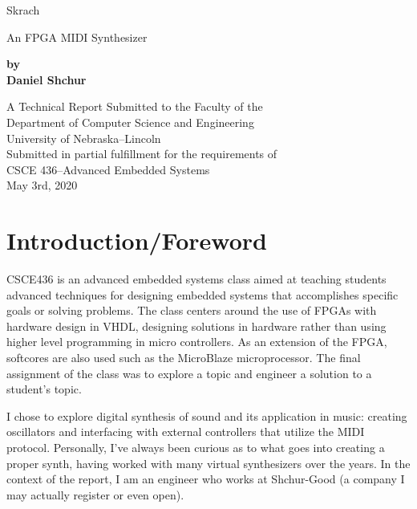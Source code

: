 \documentclass[12pt]{article}
\begin{document}
\begin{titlepage}
    \begin{center}
        \vspace*{1cm}
 
        {\fontsize{60}{75}\atnight Skrach}
 
        \vspace{0.5cm}
        \Large
        An FPGA MIDI Synthesizer
 
        \vspace{3cm}
 
        \textbf{by\\Daniel Shchur}
 
        \vfill
        
        \Large
        A Technical Report Submitted to the Faculty of the\\
        Department of Computer Science and Engineering\\
        University of Nebraska--Lincoln\\
        
        \vspace{1cm}
        Submitted in partial fulfillment for the requirements of\\
        CSCE 436--Advanced Embedded Systems\\
        May 3rd, 2020
 
    \end{center}
\end{titlepage}

\tableofcontents

\newpage

\section{Introduction/Foreword}
CSCE436 is an advanced embedded systems class aimed at teaching students advanced techniques for designing embedded systems that accomplishes specific goals or solving problems. The class centers around the use of FPGAs with hardware design in VHDL, designing solutions in hardware rather than using higher level programming in micro controllers. As an extension of the FPGA, softcores are also used such as the MicroBlaze microprocessor. The final assignment of the class was to explore a topic and engineer a solution to a student's topic.

I chose to explore digital synthesis of sound and its application in music: creating oscillators and interfacing with external controllers that utilize the MIDI protocol. Personally, I've always been curious as to what goes into creating a proper synth, having worked with many virtual synthesizers over the years. In the context of the report, I am an engineer who works at Shchur-Good (a company I may actually register or even open).
\end{document}
